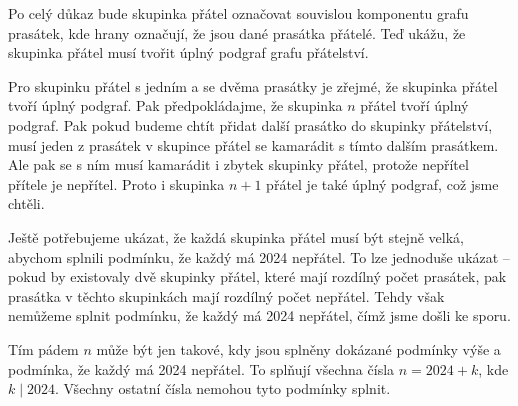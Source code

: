 \documentclass{fkssolpub}
\author{Ondřej Sedláček}
\begin{document}
Po celý důkaz bude skupinka přátel označovat souvislou komponentu grafu prasátek,
kde hrany označují, že jsou dané prasátka přátelé. Teď ukážu, že skupinka přátel
musí tvořit úplný podgraf grafu přátelství.

Pro skupinku přátel s jedním a se dvěma prasátky je zřejmé, že skupinka přátel
tvoří úplný podgraf. Pak předpokládajme, že skupinka $n$ přátel tvoří úplný
podgraf. Pak pokud budeme chtít přidat další prasátko do skupinky přátelství,
musí jeden z prasátek v skupince přátel se kamarádit s tímto dalším prasátkem.
Ale pak se s ním musí kamarádit i zbytek skupinky přátel, protože nepřítel
přítele je nepřítel. Proto i skupinka $n+1$ přátel je také úplný podgraf,
což jsme chtěli.

Ještě potřebujeme ukázat, že každá skupinka přátel musí být stejně velká,
abychom splnili podmínku, že každý má 2024 nepřátel. To lze jednoduše ukázat
-- pokud by existovaly dvě skupinky přátel, které mají rozdílný počet prasátek,
pak prasátka v těchto skupinkách mají rozdílný počet nepřátel. Tehdy však
nemůžeme splnit podmínku, že každý má 2024 nepřátel, čímž jsme došli ke sporu.

Tím pádem $n$ může být jen takové, kdy jsou splněny dokázané podmínky výše a
podmínka, že každý má 2024 nepřátel. To splňují všechna čísla $n = 2024 + k$,
kde $k \mid 2024$. Všechny ostatní čísla nemohou tyto podmínky splnit.
\end{document}

